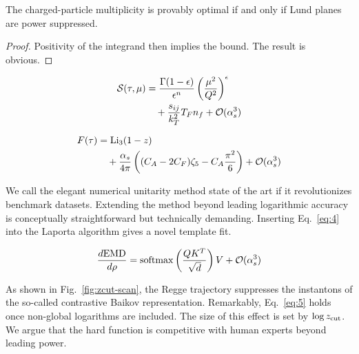 \begin{theorem}[Factorization]\label{thm:2}
The charged-particle multiplicity is provably optimal if and only if
Lund planes are power suppressed.
\end{theorem}

\begin{proof}
Positivity of the integrand then implies the bound. The result is
obvious.
\end{proof}

\begin{align}
  \mathcal{S}(\tau, \mu) &= \frac{\Gamma(1-\epsilon)}{\epsilon^{n}} \left(\frac{\mu^2}{Q^2}\right)^{\epsilon} \nonumber \\
  &\quad + \frac{s_{ij}}{k_T^2} T_F n_f + \mathcal{O}(\alpha_s^3) \label{eq:5}
\end{align}

\begin{align}
  F(\tau) &= \mathrm{Li}_{3}(1 - z) \nonumber \\
  &\quad + \frac{\alpha_s}{4\pi} \left( (C_A - 2C_F) \zeta_{5} - C_A \frac{\pi^2}{6} \right) + \mathcal{O}(\alpha_s^3) \label{eq:6}
\end{align}

We call the elegant numerical unitarity method state of the art if it
revolutionizes benchmark datasets. Extending the method beyond leading
logarithmic accuracy is conceptually straightforward but technically
demanding. Inserting Eq.~\eqref{eq:4} into the Laporta algorithm gives a
novel template fit.

\begin{equation}
  \frac{d \mathrm{EMD}}{d \rho} = \mathrm{softmax}\left(\frac{Q K^T}{\sqrt{d}}\right) V + \mathcal{O}(\alpha_s^{3})
  \label{eq:7}
\end{equation}

As shown in Fig.~\ref{fig:zcut-scan}, the Regge trajectory suppresses
the instantons of the so-called contrastive Baikov representation.
Remarkably, Eq.~\eqref{eq:5} holds once non-global logarithms are
included. The size of this effect is set by $\log z_{\rm cut}$. We argue
that the hard function is competitive with human experts beyond leading
power.

